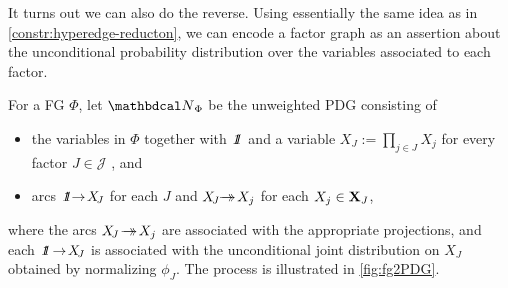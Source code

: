 It turns out we can also do the reverse. 
Using essentially the same idea as in \cref{constr:hyperedge-reducton},
we can encode a factor graph as an assertion about the unconditional
probability distribution over the variables associated to each
factor.  

\begin{defn} \label{def:fg2PDG}
For a FG $\Phi$, let $\UPDGof{\Phi}$ be
the unweighted PDG consisting of
\begin{itemize}[nosep]
	\item the variables in $\Phi$ together
   with $\pdgunit$ and a variable $X_{\!J} := \prod_{j \in J} X_j$ for every factor $J \in \mathcal J$%
   , and
   \item arcs ${\pdgunit} \!\!\to\! X_{\!J}$ for each $J$ and $X_{\!J} \!\!\rightarrow\mathrel{\mspace{-15mu}}\rightarrow\! X_j$ for each $X_j \in \mathbf X_J$,
\end{itemize}
where the arcs $ X_{\!J} \!\rightarrow\mathrel{\mspace{-15mu}}\rightarrow\! X_j$ are associated with the appropriate projections, and each ${\pdgunit} \!\to\! X_{\!J}$ is associated with the unconditional joint distribution on $X_J$ obtained by normalizing $\phi_J$. 
The process is illustrated in \cref{fig:fg2PDG}.
\end{defn}



